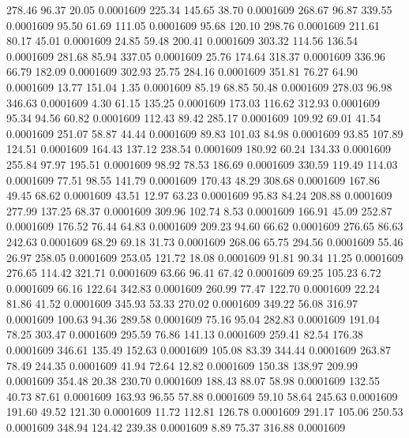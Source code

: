  278.46   96.37   20.05   0.0001609
 225.34  145.65   38.70   0.0001609
 268.67   96.87  339.55   0.0001609
  95.50   61.69  111.05   0.0001609
  95.68  120.10  298.76   0.0001609
 211.61   80.17   45.01   0.0001609
  24.85   59.48  200.41   0.0001609
 303.32  114.56  136.54   0.0001609
 281.68   85.94  337.05   0.0001609
  25.76  174.64  318.37   0.0001609
 336.96   66.79  182.09   0.0001609
 302.93   25.75  284.16   0.0001609
 351.81   76.27   64.90   0.0001609
  13.77  151.04    1.35   0.0001609
  85.19   68.85   50.48   0.0001609
 278.03   96.98  346.63   0.0001609
   4.30   61.15  135.25   0.0001609
 173.03  116.62  312.93   0.0001609
  95.34   94.56   60.82   0.0001609
 112.43   89.42  285.17   0.0001609
 109.92   69.01   41.54   0.0001609
 251.07   58.87   44.44   0.0001609
  89.83  101.03   84.98   0.0001609
  93.85  107.89  124.51   0.0001609
 164.43  137.12  238.54   0.0001609
 180.92   60.24  134.33   0.0001609
 255.84   97.97  195.51   0.0001609
  98.92   78.53  186.69   0.0001609
 330.59  119.49  114.03   0.0001609
  77.51   98.55  141.79   0.0001609
 170.43   48.29  308.68   0.0001609
 167.86   49.45   68.62   0.0001609
  43.51   12.97   63.23   0.0001609
  95.83   84.24  208.88   0.0001609
 277.99  137.25   68.37   0.0001609
 309.96  102.74    8.53   0.0001609
 166.91   45.09  252.87   0.0001609
 176.52   76.44   64.83   0.0001609
 209.23   94.60   66.62   0.0001609
 276.65   86.63  242.63   0.0001609
  68.29   69.18   31.73   0.0001609
 268.06   65.75  294.56   0.0001609
  55.46   26.97  258.05   0.0001609
 253.05  121.72   18.08   0.0001609
  91.81   90.34   11.25   0.0001609
 276.65  114.42  321.71   0.0001609
  63.66   96.41   67.42   0.0001609
  69.25  105.23    6.72   0.0001609
  66.16  122.64  342.83   0.0001609
 260.99   77.47  122.70   0.0001609
  22.24   81.86   41.52   0.0001609
 345.93   53.33  270.02   0.0001609
 349.22   56.08  316.97   0.0001609
 100.63   94.36  289.58   0.0001609
  75.16   95.04  282.83   0.0001609
 191.04   78.25  303.47   0.0001609
 295.59   76.86  141.13   0.0001609
 259.41   82.54  176.38   0.0001609
 346.61  135.49  152.63   0.0001609
 105.08   83.39  344.44   0.0001609
 263.87   78.49  244.35   0.0001609
  41.94   72.64   12.82   0.0001609
 150.38  138.97  209.99   0.0001609
 354.48   20.38  230.70   0.0001609
 188.43   88.07   58.98   0.0001609
 132.55   40.73   87.61   0.0001609
 163.93   96.55   57.88   0.0001609
  59.10   58.64  245.63   0.0001609
 191.60   49.52  121.30   0.0001609
  11.72  112.81  126.78   0.0001609
 291.17  105.06  250.53   0.0001609
 348.94  124.42  239.38   0.0001609
   8.89   75.37  316.88   0.0001609
